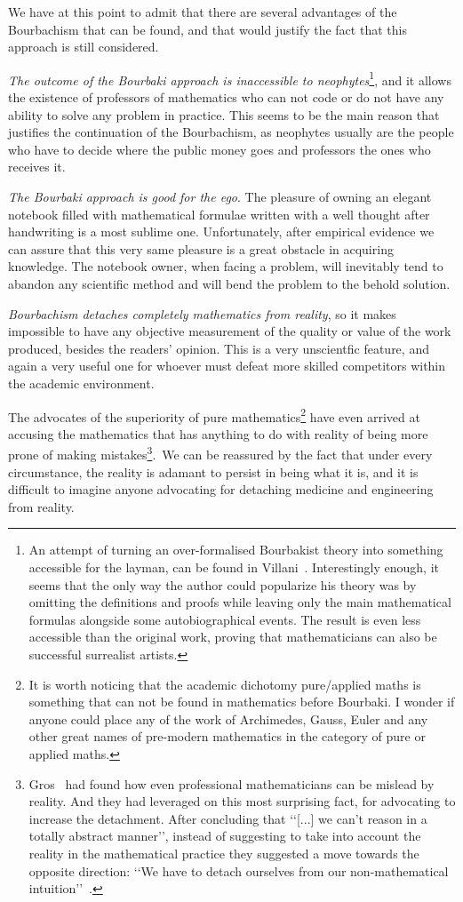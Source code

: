 \documentclass[]{scrartcl}
\theoremstyle{definition}
\begin{document}
We have at this point to admit that there are several advantages of the Bourbachism that can be found, and that would justify the fact that this approach is still considered.

\emph{The outcome of the Bourbaki approach is inaccessible to neophytes}\footnote{
    An attempt of turning an over-formalised Bourbakist theory into something accessible for the layman, can be found in Villani~\cite{villani2003livingtheorem}. Interestingly enough, it seems that the only way the author could popularize his theory was by omitting the definitions and proofs while leaving only the main mathematical formulas alongside some autobiographical events. The result is even less accessible than the original work, proving that mathematicians can also be successful surrealist artists.
}, and it allows the existence of professors of mathematics who can not code or do not have any ability to solve any problem in practice. This seems to be the main reason that justifies the continuation of the Bourbachism, as neophytes usually are the people who have to decide where the public money goes and professors the ones who receives it.

\emph{The Bourbaki approach is good for the ego}. The pleasure of owning an elegant notebook filled with mathematical formulae written with a well thought after handwriting is a most sublime one. Unfortunately, after empirical evidence we can assure that this very same pleasure is a great obstacle in acquiring knowledge. The notebook owner, when facing a problem, will inevitably tend to abandon any scientific method and will bend the problem to the behold solution.

\emph{Bourbachism detaches completely mathematics from reality}, so it makes impossible to have any objective measurement of the quality or value of the work produced, besides the readers' opinion. This is a very unscientfic feature, and again a very useful one for whoever must defeat  more skilled competitors within the academic environment. 

The advocates of the superiority of pure mathematics\footnote{
    It is worth noticing that the academic dichotomy pure/applied maths is something that can not be found in mathematics before Bourbaki. I wonder if anyone could place any of the work of Archimedes, Gauss, Euler and any other great names of pre-modern mathematics in the category of pure or applied maths.
} have even arrived at accusing the mathematics that has anything to do with reality of being more prone of making mistakes\footnote{
    Gros~\cite{gros2019masters} had found how even professional mathematicians can be mislead by reality. And they had leveraged on this most surprising fact, for advocating to increase the detachment. After concluding that \lq\lq [...] we can't reason in a totally abstract manner\rq\rq, instead of suggesting to take into account the reality in the mathematical practice they suggested a move towards the opposite direction: \lq\lq We have to detach ourselves from our non-mathematical intuition\rq\rq~\cite{gros2019sciencedaily}.
}. We can be reassured by the fact that under every circumstance, the reality is adamant to persist in being what it is, and it is difficult to imagine anyone advocating for detaching medicine and engineering from reality.
\end{document}
